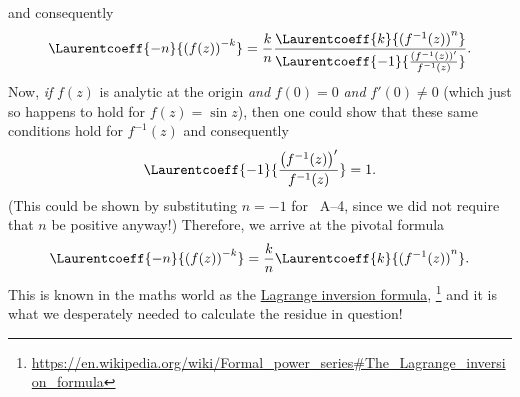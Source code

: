 and consequently
\[
    \Laurentcoeff{-n}{{(f(z))}^{-k}}
    = \frac{k}{n} \frac{\Laurentcoeff{k}{{(f^{-1} (z))}^n}}{
        \Laurentcoeff{-1}{\frac{{\left( f^{-1} (z) \right)}'}{f^{-1} (z)}}
    }.
\]
Now, \emph{if} $f(z)$ is analytic at the origin \emph{and} $f(0) = 0$ \emph{and} $f'(0) \neq 0$
(which just so happens to hold for $f(z) = \sin z$),
then one could show that these same conditions hold for $f^{-1} (z)$ and consequently
\[
    \Laurentcoeff{-1}{\frac{{\left( f^{-1} (z) \right)}'}{f^{-1} (z)}} = 1.
\]
(This could be shown by substituting $n = -1$ for ~A--4,
since we did not require that $n$ be positive anyway!)
Therefore, we arrive at the pivotal formula
\[
    \Laurentcoeff{-n}{{(f(z))}^{-k}} = \frac{k}{n} \Laurentcoeff{k}{{(f^{-1} (z))}^n}.
\]
This is known in the maths world as the \href{https://en.wikipedia.org/wiki/Formal_power_series#The_Lagrange_inversion_formula}{Lagrange inversion formula},%
\footnote{\url{https://en.wikipedia.org/wiki/Formal_power_series\#The_Lagrange_inversion_formula}}
and it is what we desperately needed to calculate the residue in question!

